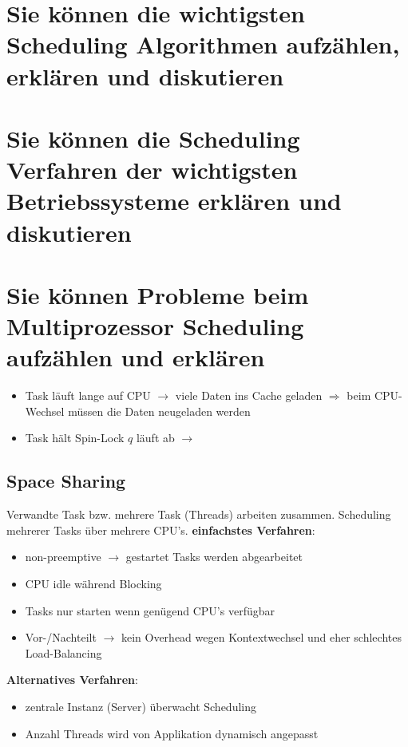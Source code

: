 \documentclass{report}
\theoremstyle{definition}
\theoremstyle{example}
\begin{document}
\section{Sie können die wichtigsten Scheduling Algorithmen aufzählen, erklären und diskutieren}

\section{Sie können die Scheduling Verfahren der wichtigsten Betriebssysteme erklären und diskutieren}

\section{Sie können Probleme beim Multiprozessor Scheduling aufzählen und erklären}
	\begin{itemize}
		\item Task läuft lange auf CPU $\rightarrow$ viele Daten ins Cache geladen $\Rightarrow$ beim CPU-Wechsel müssen die Daten neugeladen werden
		\item Task hält Spin-Lock $q$ läuft ab $\rightarrow$
	\end{itemize}
	
	\subsection{Space Sharing}
Verwandte Task bzw. mehrere Task (Threads) arbeiten zusammen. Scheduling mehrerer Tasks über mehrere CPU's.
\textbf{einfachstes Verfahren}:\\
\begin{itemize}
	\item non-preemptive $\rightarrow$ gestartet Tasks werden abgearbeitet
	\item CPU idle während Blocking
	\item Tasks nur starten wenn genügend CPU's verfügbar
	\item Vor-/Nachteilt $\rightarrow$ kein Overhead wegen Kontextwechsel und eher schlechtes Load-Balancing
\end{itemize}

\textbf{Alternatives Verfahren}:\\
\begin{itemize}
	\item zentrale Instanz (Server) überwacht Scheduling
	\item Anzahl Threads wird von Applikation dynamisch angepasst
\end{itemize}
\end{document}
